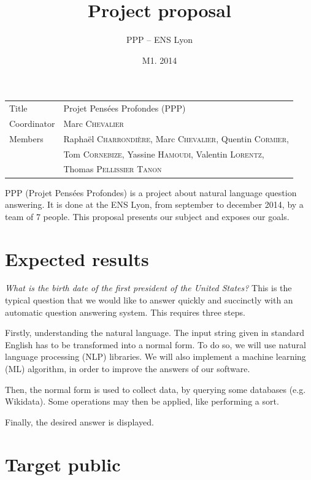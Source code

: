 \documentclass[a4paper,10pt]{article}
\title{Project proposal}
\author{PPP \--- ENS Lyon}
\date{M1. 2014}
\begin{document}
\maketitle

\begin{center}
 \begin{tabular}{|ll|}
\hline
Title & Projet Pensées Profondes (PPP)\\
Coordinator & Marc \textsc{Chevalier}\\
Members & Raphaël \textsc{Charrondière}, Marc \textsc{Chevalier}, Quentin \textsc{Cormier}, \\
        & Tom \textsc{Cornebize}, Yassine \textsc{Hamoudi}, Valentin \textsc{Lorentz},\\
        & Thomas \textsc{Pellissier} \textsc{Tanon}\\
\hline
\end{tabular}
\end{center}

PPP (Projet Pensées Profondes) is a project about natural language question answering. It is done at the ENS Lyon, from september to december 2014, by a team of 7 people. This proposal presents our subject and exposes our goals.

\section{Expected results}

\emph{What is the birth date of the first president of the United States?} This is the typical question that we would like to answer quickly and succinctly with an automatic question answering system. This requires three steps. 

Firstly, understanding the natural language. The input string given in standard English has to be transformed into a normal form. To do so, we will use natural language processing (NLP) libraries. We will also implement a machine learning (ML) algorithm, in order to improve the answers of our software.

Then, the normal form is used to collect data, by querying some databases (e.g. Wikidata). Some operations may then be applied, like performing a sort.

Finally, the desired answer is displayed.

\section{Target public}
\end{document}
